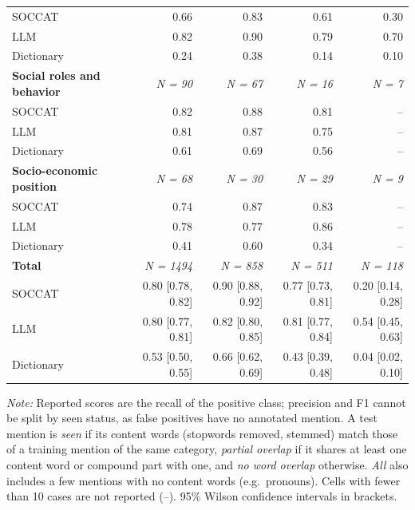 \begin{table}[htb]
\begin{threeparttable}
\begin{tabular}{l r r r r}
\quad SOCCAT & 0.66 & 0.83 & 0.61 & 0.30 \\
\quad LLM & 0.82 & 0.90 & 0.79 & 0.70 \\
\quad Dictionary & 0.24 & 0.38 & 0.14 & 0.10 \\
\addlinespace
\textbf{Social roles and behavior} & \textit{N = 90} & \textit{N = 67} & \textit{N = 16} & \textit{N = 7} \\
\quad SOCCAT & 0.82 & 0.88 & 0.81 & -- \\
\quad LLM & 0.81 & 0.87 & 0.75 & -- \\
\quad Dictionary & 0.61 & 0.69 & 0.56 & -- \\
\addlinespace
\textbf{Socio-economic position} & \textit{N = 68} & \textit{N = 30} & \textit{N = 29} & \textit{N = 9} \\
\quad SOCCAT & 0.74 & 0.87 & 0.83 & -- \\
\quad LLM & 0.78 & 0.77 & 0.86 & -- \\
\quad Dictionary & 0.41 & 0.60 & 0.34 & -- \\
\midrule
\textbf{Total} & \textit{N = 1494} & \textit{N = 858} & \textit{N = 511} & \textit{N = 118} \\
\quad SOCCAT & 0.80 {\tiny [0.78, 0.82]} & 0.90 {\tiny [0.88, 0.92]} & 0.77 {\tiny [0.73, 0.81]} & 0.20 {\tiny [0.14, 0.28]} \\
\quad LLM & 0.80 {\tiny [0.77, 0.81]} & 0.82 {\tiny [0.80, 0.85]} & 0.81 {\tiny [0.77, 0.84]} & 0.54 {\tiny [0.45, 0.63]} \\
\quad Dictionary & 0.53 {\tiny [0.50, 0.55]} & 0.66 {\tiny [0.62, 0.69]} & 0.43 {\tiny [0.39, 0.48]} & 0.04 {\tiny [0.02, 0.10]} \\
\bottomrule
\end{tabular}
\begin{tablenotes}[flushleft]
\footnotesize
\item \textit{Note:} Reported scores are the recall of the positive class; precision and F1 cannot be split by seen status, as false positives have no annotated mention. A test mention is \emph{seen} if its content words (stopwords removed, stemmed) match those of a training mention of the same category, \emph{partial overlap} if it shares at least one content word or compound part with one, and \emph{no word overlap} otherwise. \emph{All} also includes a few mentions with no content words (e.g.\ pronouns). Cells with fewer than 10 cases are not reported (--). 95\% Wilson confidence intervals in brackets.
\end{tablenotes}
\end{threeparttable}
\end{table}
